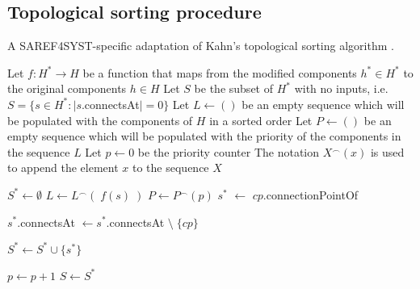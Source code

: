  



\subsection{Topological sorting procedure}
 

\begin{algorithm}[h!]
\caption{A SAREF4SYST-specific adaptation of Kahn's topological sorting algorithm \cite{Kahn1962TopologicalSO}.}
\label{alg:topological_sorting}

\begin{algorithmic}[1]
    
    
    \State Let $f : H^* \to H$ be a function that maps from the modified components $h^* \in H^*$ to the original components $h \in H$
    \State Let $S$ be the subset of $H^*$ with no inputs, i.e. \newline$S = \{s \in H^* : |s$.connectsAt$| = 0\}$
    \State Let $L\gets ()$ be an empty sequence which will be populated with the components of $H$ in a sorted order
    \State Let $P\gets()$ be an empty sequence which will be populated with the priority of the components in the sequence $L$
    \State Let $p \gets 0$ be the priority counter
    \State The notation $X^\frown(x)$ is used to append the element $x$ to the sequence $X$
    
    
        \State $S^* \gets \emptyset$
            \State $L \gets L^\frown(\;f(s)\;)$
            \State $P \gets P^\frown(p)$
                    \State $s^*$ $\gets$ $cp$.connectionPointOf
                    
                    \State $s^*$.connectsAt $\gets s^*$.connectsAt $\setminus \; \{cp\}$ 
                    
    
                        \State $S^* \gets S^* \cup \{s^*\}$
                    \EndIf
                
                \EndFor
                

            \EndFor
        \EndFor
        \State $p \gets p + 1$
        \State $S \gets S^*$
    \EndWhile
\end{algorithmic}
\end{algorithm}





